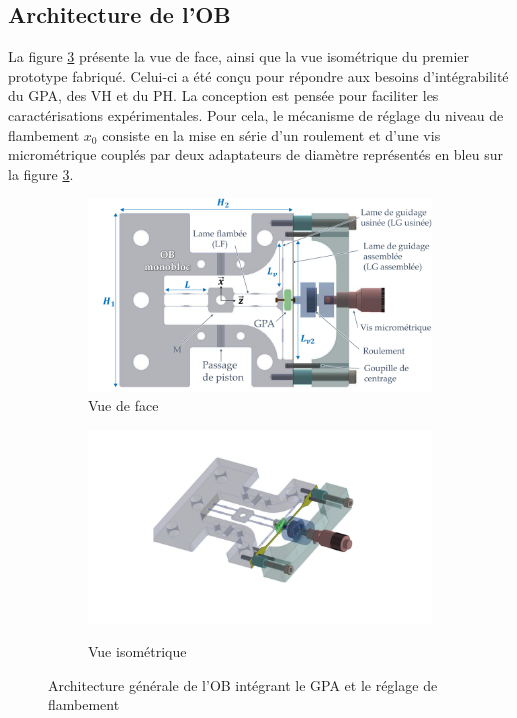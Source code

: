 	\subsection{Architecture de l'OB}
	\label{subsec:3.1.2:Architecture de l'OB monobloc}	
La figure \ref{fig:moboloc+GPA} présente la vue de face, ainsi que la vue isométrique du premier prototype fabriqué. Celui-ci a été conçu pour répondre aux besoins d'intégrabilité du GPA, des VH et du PH. La conception est pensée pour faciliter les caractérisations expérimentales. Pour cela, le mécanisme de réglage du niveau de flambement $x_0$ consiste en la mise en série d'un roulement et d'une vis micrométrique couplés par deux adaptateurs de diamètre représentés en bleu sur la figure \ref{fig:moboloc+GPA}.
\begin{figure}[!htbp]
\begin{center}
	\begin{subfigure}[b]{0.59\textwidth}
    \captionsetup{justification=centering}
	\includegraphics[trim={1.4cm 0cm 0cm 0cm},clip, width=\textwidth]{../Chap3/Figure/monobloc+GPA_face.pdf}
	\caption{Vue de face}
	\label{fig:moboloc+GPA_face}
	\end{subfigure}
	\begin{subfigure}[b]{0.4\textwidth}
    \captionsetup{justification=centering}
	\includegraphics[trim={6cm 3cm 7.5cm 2.6cm},clip,width=\textwidth]{../Chap3/Figure/monobloc+GPA_iso.pdf}
	\label{fig:moboloc+GPA_iso}
	\caption{Vue isométrique}
	\end{subfigure}
	\caption{Architecture générale de l'OB intégrant le GPA et le réglage de flambement}
	\label{fig:moboloc+GPA}
\end{center}	
\end{figure}

